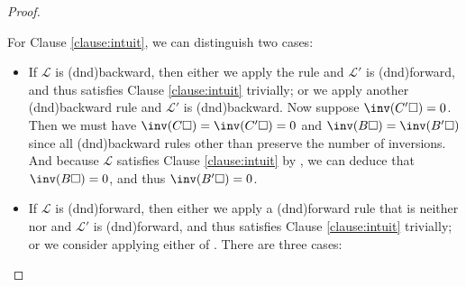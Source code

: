 \begin{scope}
\begin{proof}
\begin{enumerate}[itemsep=0.8em]
\begin{itemize}
\begin{enumerate}[itemsep=0.4em]
        For Clause \ref{clause:intuit}, we can distinguish two cases:
        \begin{itemize}
          \item If $\mathcal{L}$ is \kl(dnd){backward}, then either we apply the
          {} rule and $\mathcal{L'}$ is \kl(dnd){forward}, and thus
          satisfies Clause \ref{clause:intuit} trivially; or we apply another
          \kl(dnd){backward} rule and $\mathcal{L'}$ is \kl(dnd){backward}. Now suppose
          $\inv(C'\hole) = 0$. Then we must have $\inv(C\hole) = \inv(C'\hole) =
          0$ and $\inv(B\hole) = \inv(B'\hole)$ since all \kl(dnd){backward} rules other
          than {} preserve the number of inversions. And
          because $\mathcal{L}$ satisfies Clause \ref{clause:intuit} by
          , we can deduce that $\inv(B\hole) = 0$, and thus
          $\inv(B'\hole) = 0$.
          \item If $\mathcal{L}$ is \kl(dnd){forward}, then either we apply a \kl(dnd){forward} rule
          that is neither {} nor {} and
          $\mathcal{L'}$ is \kl(dnd){forward}, and thus satisfies Clause
          \ref{clause:intuit} trivially; or we consider applying either
          {} of {}. There are three cases:
\end{itemize}
\end{enumerate}
\end{itemize}
\end{enumerate}
\end{proof}
\end{scope}
